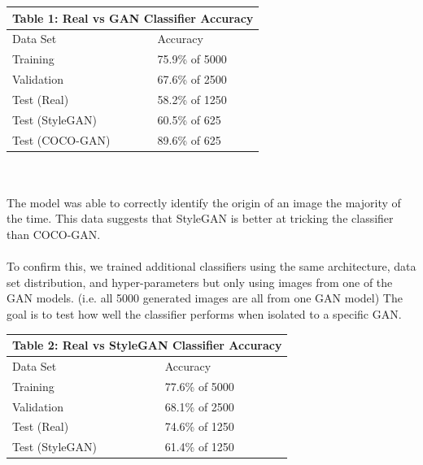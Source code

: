 \documentclass[10pt]{article}
\begin{document}
\begin{multicols*}{2}
        \begin{tabular}{ |p{4cm}|p{3cm}|  }
         \hline
         \multicolumn{2}{|c|}{Table 1: \textbf{Real vs GAN Classifier Accuracy}} \\
         \hline
        Data Set     & Accuracy\\
         \hline
        Training        & 75.9\% of 5000 \\
         \hline
        Validation      & 67.6\% of 2500 \\
         \hline
        Test (Real)     & 58.2\% of 1250 \\
         \hline
        Test (StyleGAN) & 60.5\% of 625  \\
         \hline
        Test (COCO-GAN) & 89.6\% of 625 \\
         \hline
        \end{tabular}
        \\\\
        The model was able to correctly identify the origin of an image the majority of the time.
        This data suggests that StyleGAN is better at tricking the classifier than COCO-GAN.
        \\\\
        To confirm this, we trained additional classifiers using the same architecture, data set distribution, and hyper-parameters but only using images from one of the GAN models.
        (i.e. all 5000 generated images are all from one GAN model)
        The goal is to test how well the classifier performs when isolated to a specific GAN.\\

        \begin{tabular}{ |p{4cm}|p{4.2cm}|  }
             \hline
             \multicolumn{2}{|c|}{Table 2: \textbf{Real vs StyleGAN Classifier Accuracy}} \\
             \hline
            Data Set     & Accuracy\\
             \hline
            Training        & 77.6\% of 5000 \\
             \hline
            Validation      & 68.1\% of 2500 \\
             \hline
            Test (Real)     & 74.6\% of 1250 \\
             \hline
            Test (StyleGAN) & 61.4\% of 1250  \\
             \hline
        \end{tabular}
        \\


\end{multicols*}
\end{document}
